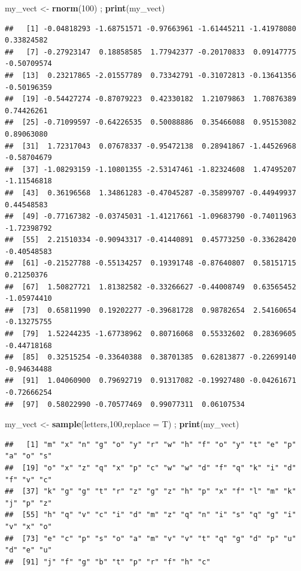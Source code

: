 \documentclass[
]{book}
\newenvironment{Shaded}{\begin{snugshade}}{\end{snugshade}}
\newcommand{\DataTypeTok}[1]{\textcolor[rgb]{0.13,0.29,0.53}{#1}}
\newcommand{\DecValTok}[1]{\textcolor[rgb]{0.00,0.00,0.81}{#1}}
\newcommand{\KeywordTok}[1]{\textcolor[rgb]{0.13,0.29,0.53}{\textbf{#1}}}
\newcommand{\NormalTok}[1]{#1}
\newcommand{\StringTok}[1]{\textcolor[rgb]{0.31,0.60,0.02}{#1}}
\begin{document}
\begin{Shaded}
\begin{Highlighting}[]
\NormalTok{my_vect <-}\StringTok{ }\KeywordTok{rnorm}\NormalTok{(}\DecValTok{100}\NormalTok{) ; }\KeywordTok{print}\NormalTok{(my_vect)}
\end{Highlighting}
\end{Shaded}

\begin{verbatim}
##   [1] -0.04818293 -1.68751571 -0.97663961 -1.61445211 -1.41978080  0.33824582
##   [7] -0.27923147  0.18858585  1.77942377 -0.20170833  0.09147775 -0.50709574
##  [13]  0.23217865 -2.01557789  0.73342791 -0.31072813 -0.13641356 -0.50196359
##  [19] -0.54427274 -0.87079223  0.42330182  1.21079863  1.70876389  0.74426261
##  [25] -0.71099597 -0.64226535  0.50088886  0.35466088  0.95153082  0.89063080
##  [31]  1.72317043  0.07678337 -0.95472138  0.28941867 -1.44526968 -0.58704679
##  [37] -1.08293159 -1.10801355 -2.53147461 -1.82324608  1.47495207 -1.11546818
##  [43]  0.36196568  1.34861283 -0.47045287 -0.35899707 -0.44949937  0.44548583
##  [49] -0.77167382 -0.03745031 -1.41217661 -1.09683790 -0.74011963 -1.72398792
##  [55]  2.21510334 -0.90943317 -0.41440891  0.45773250 -0.33628420 -0.40548583
##  [61] -0.21527788 -0.55134257  0.19391748 -0.87640807  0.58151715  0.21250376
##  [67]  1.50827721  1.81382582 -0.33266627 -0.44008749  0.63565452 -1.05974410
##  [73]  0.65811990  0.19202277 -0.39681728  0.98782654  2.54160654 -0.13275755
##  [79]  1.52244235 -1.67738962  0.80716068  0.55332602  0.28369605 -0.44718168
##  [85]  0.32515254 -0.33640388  0.38701385  0.62813877 -0.22699140 -0.94634488
##  [91]  1.04060900  0.79692719  0.91317082 -0.19927480 -0.04261671 -0.72666254
##  [97]  0.58022990 -0.70577469  0.99077311  0.06107534
\end{verbatim}

\begin{Shaded}
\begin{Highlighting}[]
\NormalTok{my_vect <-}\StringTok{ }\KeywordTok{sample}\NormalTok{(letters,}\DecValTok{100}\NormalTok{,}\DataTypeTok{replace =}\NormalTok{ T) ; }\KeywordTok{print}\NormalTok{(my_vect)}
\end{Highlighting}
\end{Shaded}

\begin{verbatim}
##   [1] "m" "x" "n" "g" "o" "y" "r" "w" "h" "f" "o" "y" "t" "e" "p" "a" "o" "s"
##  [19] "o" "x" "z" "q" "x" "p" "c" "w" "w" "d" "f" "q" "k" "i" "d" "f" "v" "c"
##  [37] "k" "g" "g" "t" "r" "z" "g" "z" "h" "p" "x" "f" "l" "m" "k" "j" "p" "z"
##  [55] "h" "q" "v" "c" "i" "d" "m" "z" "q" "n" "i" "s" "q" "g" "i" "v" "x" "o"
##  [73] "e" "c" "p" "s" "o" "a" "m" "v" "v" "t" "q" "g" "d" "p" "u" "d" "e" "u"
##  [91] "j" "f" "g" "b" "t" "p" "r" "f" "h" "c"
\end{verbatim}
\end{document}
